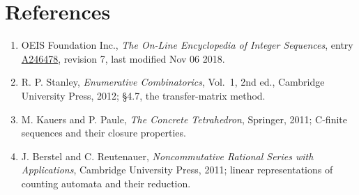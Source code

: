 \documentclass[11pt]{article}
\theoremstyle{definition}
\begin{document}
\section{References}

\begin{enumerate}

\item OEIS Foundation Inc., \emph{The On-Line Encyclopedia of Integer Sequences}, entry \href{https://oeis.org/A246478}{A246478}, revision 7, last modified Nov 06 2018.

\item R. P. Stanley, \emph{Enumerative Combinatorics}, Vol.~1, 2nd ed., Cambridge University Press, 2012; \S4.7, the transfer-matrix method.

\item M. Kauers and P. Paule, \emph{The Concrete Tetrahedron}, Springer, 2011; C-finite sequences and their closure properties.

\item J. Berstel and C. Reutenauer, \emph{Noncommutative Rational Series with Applications}, Cambridge University Press, 2011; linear representations of counting automata and their reduction.

\end{enumerate}
\end{document}
